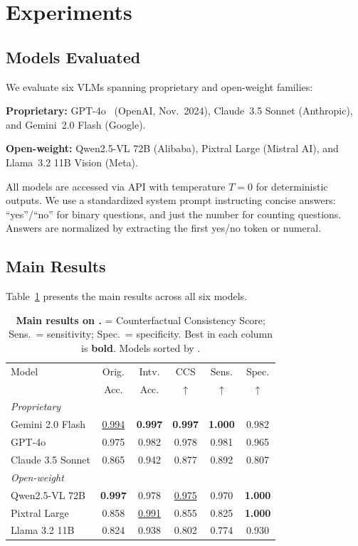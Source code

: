 \section{Experiments}
\label{sec:experiments}

\subsection{Models Evaluated}

We evaluate six VLMs spanning proprietary and open-weight families:

\noindent\textbf{Proprietary:} GPT-4o~\cite{radford2021clip} (OpenAI, Nov.\ 2024), Claude~3.5 Sonnet (Anthropic), and Gemini~2.0 Flash (Google).

\noindent\textbf{Open-weight:} Qwen2.5-VL 72B (Alibaba), Pixtral Large (Mistral AI), and Llama~3.2 11B Vision (Meta).

All models are accessed via API with temperature $T=0$ for deterministic outputs. We use a standardized system prompt instructing concise answers: ``yes''/``no'' for binary questions, and just the number for counting questions. Answers are normalized by extracting the first yes/no token or numeral.

\subsection{Main Results}

Table~\ref{tab:main_results} presents the main results across all six models.

\begin{table}[t]
\centering
\caption{\textbf{Main results on \method.} \ccs = Counterfactual Consistency Score; Sens.\ = sensitivity; Spec.\ = specificity. Best in each column is \textbf{bold}. Models sorted by \ccs.}
\label{tab:main_results}
\small
\setlength{\tabcolsep}{3.5pt}
\begin{tabular}{@{}l c c c c c@{}}
\toprule
Model & Orig. & Intv. & CCS & Sens. & Spec. \\
 & Acc. & Acc. & $\uparrow$ & $\uparrow$ & $\uparrow$ \\
\midrule
\multicolumn{6}{l}{\textit{Proprietary}} \\
Gemini 2.0 Flash & \underline{0.994} & \textbf{0.997} & \textbf{0.997} & \textbf{1.000} & 0.982 \\
GPT-4o & 0.975 & 0.982 & 0.978 & 0.981 & 0.965 \\
Claude 3.5 Sonnet & 0.865 & 0.942 & 0.877 & 0.892 & 0.807 \\
\midrule
\multicolumn{6}{l}{\textit{Open-weight}} \\
Qwen2.5-VL 72B & \textbf{0.997} & 0.978 & \underline{0.975} & 0.970 & \textbf{1.000} \\
Pixtral Large & 0.858 & \underline{0.991} & 0.855 & 0.825 & \textbf{1.000} \\
Llama 3.2 11B & 0.824 & 0.938 & 0.802 & 0.774 & 0.930 \\
\bottomrule
\end{tabular}
\end{table}

